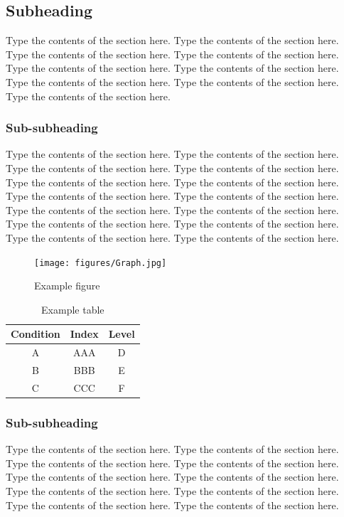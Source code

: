 \documentclass[twoside,twocolumn]{article}
\begin{document}
\subsection{Subheading}

Type the contents of the section here.  Type the contents of the section here.  Type the contents of the section here.  Type the contents of the section here.  Type the contents of the section here.  Type the contents of the section here.  Type the contents of the section here.  Type the contents of the section here.  Type the contents of the section here. 

\subsubsection{Sub-subheading}

Type the contents of the section here.  Type the contents of the section here.  Type the contents of the section here.  Type the contents of the section here.  Type the contents of the section here. Type the contents of the section here.  Type the contents of the section here.  Type the contents of the section here.  Type the contents of the section here.  Type the contents of the section here.  Type the contents of the section here.  Type the contents of the section here.  Type the contents of the section here.  Type the contents of the section here. 

\begin{figure}
\texttt{[image: figures/Graph.jpg]}
\caption{\label{Figure}Example figure}
\end{figure}

\begin{table}
\caption{\label{Table}Example table}

\begin{tabular}{c|c|c}
Condition & Index & Level \\ \hline\hline
A & AAA & D \\ \hline
B & BBB & E \\ \hline
C & CCC & F \\ \hline
\end{tabular}
\end{table}

\subsubsection{Sub-subheading}

Type the contents of the section here.  Type the contents of the section here.  Type the contents of the section here.  Type the contents of the section here.  Type the contents of the section here.  Type the contents of the section here.  Type the contents of the section here.  Type the contents of the section here.  Type the contents of the section here.  Type the contents of the section here.
\end{document}
